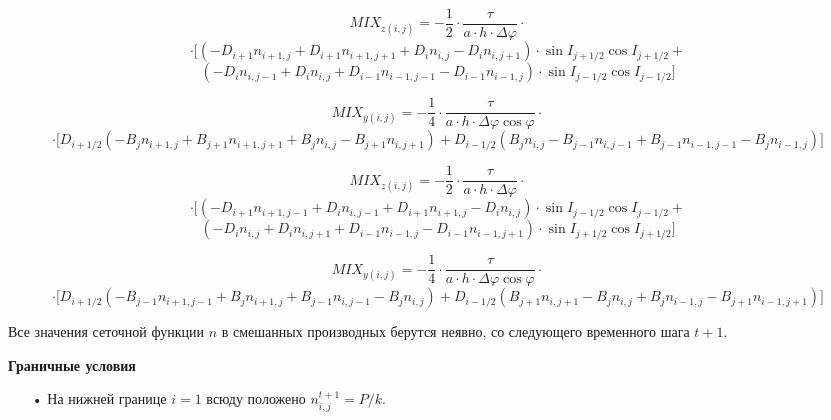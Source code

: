 \documentclass[2pt, a4paper, fleqn]{extarticle}
\let\geq\geqslant
\begin{document}
\begin{center}
\fbox{При $\sin I \geq 0$:}
\end{center}

$$MIX_{z(i, j)} = -\dfrac{1}{2}\cdot\dfrac{\tau}{a\cdot h\cdot \Delta\varphi}\cdot$$ 
$$\cdot\bigg[(-D_{i+1} n_{i+1, j} + D_{i+1}n_{i+1, j+1}+ D_i n_{i, j} - D_{i} n_{i, j+1})\cdot \sin I_{j+1/2}\cos I_{j+1/2} + $$
$$ (-D_i n_{i, j-1} + D_i n_{i, j} + D_{i-1} n_{i-1, j-1} - D_{i-1} n_{i-1, j})\cdot \sin I_{j-1/2}\cos I_{j-1/2}\bigg]$$

$$MIX_{y(i, j)} = -\dfrac{1}{4}\cdot\dfrac{\tau}{a\cdot h\cdot \Delta\varphi\cos\varphi}\cdot$$
$$\cdot\bigg[D_{i+1/2}(-B_j n_{i+1, j}+ B_{j+1} n_{i+1, j+1}+ B_{j}n_{i, j} - B_{j+1}n_{i, j+1}) +D_{i-1/2}(B_j n_{i, j} - B_{j-1}n_{i, j-1} + B_{j-1}n_{i-1, j-1} - B_j n_{i-1, j})\bigg]$$


\begin{center}
\end{center}

$$MIX_{z(i, j)} = -\dfrac{1}{2}\cdot\dfrac{\tau}{a\cdot h\cdot \Delta\varphi}\cdot$$ 
$$\cdot\bigg[(-D_{i+1} n_{i+1, j-1} + D_{i}n_{i, j-1}+ D_{i+1} n_{i+1, j} - D_{i} n_{i, j})\cdot \sin I_{j-1/2}\cos I_{j-1/2} + $$
$$ (-D_i n_{i, j} + D_i n_{i, j+1} + D_{i-1} n_{i-1, j} - D_{i-1} n_{i-1, j+1})\cdot \sin I_{j+1/2}\cos I_{j+1/2}\bigg]$$

$$MIX_{y(i, j)} = -\dfrac{1}{4}\cdot\dfrac{\tau}{a\cdot h\cdot \Delta\varphi\cos\varphi}\cdot$$
$$\cdot\bigg[D_{i+1/2}(-B_{j-1} n_{i+1, j-1}+ B_{j} n_{i+1, j}+ B_{j-1}n_{i, j-1} - B_{j}n_{i, j}) +D_{i-1/2}(B_{j+1} n_{i, j+1} - B_{j}n_{i, j} + B_{j}n_{i-1, j} - B_{j+1} n_{i-1, j+1})\bigg]$$


Все значения сеточной функции $n$ в смешанных производных берутся неявно, со следующего временного шага $t+1$.

\bigskip

\begin{center}
{\bf\Large Граничные условия}
\end{center}

\begin{itemize}
\item[•] На нижней границе $i=1$ всюду положено $n_{i, j}^{t+1} = P/k$.
\end{itemize}
\end{document}
